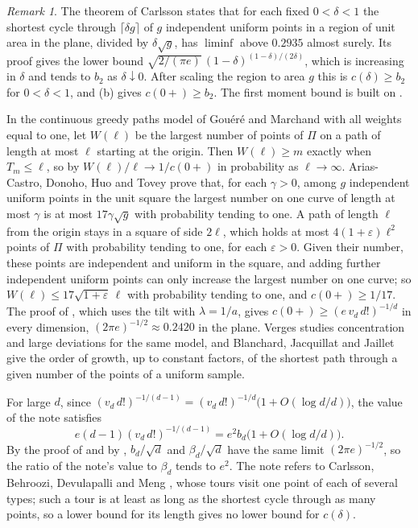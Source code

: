 \documentclass[11pt]{article}
\theoremstyle{remark}
\newtheorem{remark}[theorem]{Remark}
\begin{document}
\begin{remark}\label{rem:known}
The theorem of Carlsson \cite[Theorem~18]{Carlsson} states that for each fixed $0<\delta<1$ the shortest cycle
through $\lceil\delta g\rceil$ of $g$ independent uniform points in a region of unit area in the plane, divided by
$\delta\sqrt g$, has $\liminf$ above $0.2935$ almost surely. Its proof gives the lower bound
$\sqrt{2/(\pi e)}\,(1-\delta)^{(1-\delta)/(2\delta)}$, which is increasing in $\delta$ and tends to $b_2$ as
$\delta\downarrow 0$. After scaling the region to area $g$ this is $c(\delta)\ge b_2$ for $0<\delta<1$, and (b) gives
$c(0+)\ge b_2$. The first moment bound \cite[Lemma~9]{Carlsson} is built on \cite[Corollary~8]{Carlsson}.

In the continuous greedy paths model of Gou\'er\'e and Marchand \cite{GM} with all weights equal to one, let
$W(\ell)$ be the largest number of points of $\Pi$ on a path of length at most $\ell$ starting at the origin. Then
$W(\ell)\ge m$ exactly when $T_m\le\ell$, so by \cite[Theorem~1(e)]{AK} $W(\ell)/\ell\to 1/c(0+)$ in probability as
$\ell\to\infty$. Arias-Castro, Donoho, Huo and Tovey \cite[Theorem~1]{ADHT} prove that, for each $\gamma>0$, among
$g$ independent uniform points in the unit square the largest number on one curve of length at most $\gamma$ is at
most $17\gamma\sqrt g$ with probability tending to one. A path of length $\ell$ from the origin stays in a square of
side $2\ell$, which holds at most $4(1+\varepsilon)\ell^2$ points of $\Pi$ with probability tending to one, for each
$\varepsilon>0$. Given their number, these points are independent and uniform in the square, and adding further
independent uniform points can only increase the largest number on one curve; so $W(\ell)\le 17\sqrt{1+\varepsilon}\,\ell$ with probability tending to one, and $c(0+)\ge1/17$. The
proof of \cite[Lemma~2.1]{GM}, which uses the tilt with $\lambda=1/a$, gives $c(0+)\ge(e\,v_d\,d!)^{-1/d}$ in every
dimension, $(2\pi e)^{-1/2}\approx0.2420$ in the plane. Verges \cite{Verges} studies concentration and large
deviations for the same model, and Blanchard, Jacquillat and Jaillet \cite{BJJ} give the order of growth, up to
constant factors, of the shortest path through a given number of the points of a uniform sample.

For large $d$, since $(v_d\,d!)^{-1/(d-1)}=(v_d\,d!)^{-1/d}\bigl(1+O(\log d/d)\bigr)$, the value of the note
\cite{Anote} satisfies
\[
e(d-1)(v_d\,d!)^{-1/(d-1)}=e^2b_d\bigl(1+O(\log d/d)\bigr).
\]
By the proof of  and by \cite{Rhee}, $b_d/\sqrt d$
and $\beta_d/\sqrt d$ have the same limit $(2\pi e)^{-1/2}$, so the ratio of the note's value to $\beta_d$ tends to
$e^2$. The note refers to Carlsson, Behroozi, Devulapalli and Meng \cite{CBDM}, whose tours visit one point of each
of several types; such a tour is at least as long as the shortest cycle through as many points, so a lower bound for
its length gives no lower bound for $c(\delta)$.
\end{remark}
\end{document}
